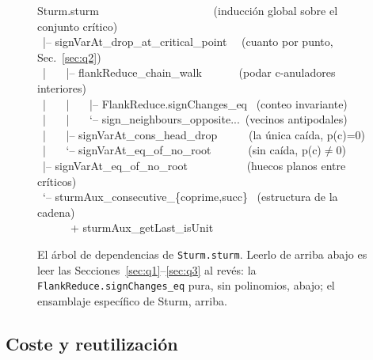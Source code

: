 \documentclass[11pt]{article}
\newcommand{\lean}[1]{\texttt{#1}}
\begin{document}
\begin{figure}[h]
\centering
\begin{tcolorbox}[colframe=ggteal,colback=ggband!18,arc=2pt,boxrule=0.7pt,left=8pt,right=8pt,
  top=5pt,bottom=5pt,width=\textwidth]
\ttfamily\footnotesize
Sturm.sturm \ \ \ \ \ \ \ \ \ \ \ \ \ \ \ \ \ \ \ \ (inducci\'on global sobre el conjunto cr\'itico)\\
\ |-- signVarAt\_drop\_at\_critical\_point \ \ (cuanto por punto, Sec.~\ref{sec:q2})\\
\ | \ \ \ |-- flankReduce\_chain\_walk \ \ \ \ \ \ (podar c-anuladores interiores)\\
\ | \ \ \ | \ \ \ |-- FlankReduce.signChanges\_eq \ (conteo invariante)\\
\ | \ \ \ | \ \ \ `-- sign\_neighbours\_opposite...\ (vecinos antipodales)\\
\ | \ \ \ |-- signVarAt\_cons\_head\_drop \ \ \ \ \ (la \'unica ca\'ida, p(c)=0)\\
\ | \ \ \ `-- signVarAt\_eq\_of\_no\_root \ \ \ \ \ \ (sin ca\'ida, p(c)$\neq$0)\\
\ |-- signVarAt\_eq\_of\_no\_root \ \ \ \ \ \ \ \ \ \ (huecos planos entre cr\'iticos)\\
\ `-- sturmAux\_consecutive\_\{coprime,succ\} \ (estructura de la cadena)\\
\ \ \ \ \ \ + sturmAux\_getLast\_isUnit
\end{tcolorbox}
\caption{El \'arbol de dependencias de \lean{Sturm.sturm}. Leerlo de arriba abajo es leer las
Secciones~\ref{sec:q1}--\ref{sec:q3} al rev\'es: la \lean{FlankReduce.signChanges\_eq} pura, sin
polinomios, abajo; el ensamblaje espec\'ifico de Sturm, arriba.}
\label{fig:deptree}
\end{figure}

\subsection*{Coste y reutilizaci\'on}
\end{document}
